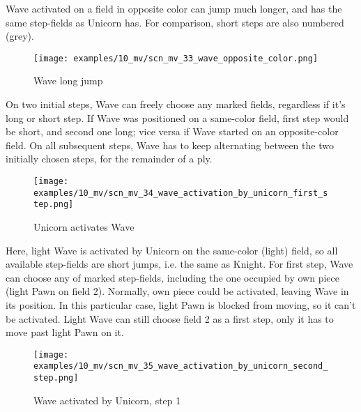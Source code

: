 Wave activated on a field in opposite color can jump much longer, and has the same step-fields
as Unicorn has. For comparison, short steps are also numbered (grey).

\vspace*{0.7\baselineskip}
\noindent
\begin{wrapfigure}[18]{l}{0.7\textwidth}
\centering
\texttt{[image: examples/10\_mv/scn\_mv\_33\_wave\_opposite\_color.png]}
\vspace*{-0.3\baselineskip}
\caption{Wave long jump}
\label{fig:scn_mv_33_wave_opposite_color}
\end{wrapfigure}
On two initial steps, Wave can freely choose any marked fields, regardless if it's long or short step.
If Wave was positioned on a same-color field, first step would be short, and second one long; vice versa
if Wave started on an opposite-color field. On all subsequent steps, Wave has to keep alternating between
the two initially chosen steps, for the remainder of a ply.

\clearpage %

\vspace*{-2.1\baselineskip}
\noindent
\begin{figure}[!h]
\texttt{[image: examples/10\_mv/scn\_mv\_34\_wave\_activation\_by\_unicorn\_first\_step.png]}
\vspace*{-1.3\baselineskip}
\caption{Unicorn activates Wave}
\label{fig:scn_mv_34_wave_activation_by_unicorn_first_step}
\end{figure}

\vspace*{-0.3\baselineskip}
Here, light Wave is activated by Unicorn on the same-color (light) field, so all available
step-fields are short jumps, i.e. the same as Knight. For first step, Wave can choose any of
marked step-fields, including the one occupied by own piece (light Pawn on field 2). Normally,
own piece could be activated, leaving Wave in its position. In this particular case, light Pawn
is blocked from moving, so it can't be activated. Light Wave can still choose field 2 as a first
step, only it has to move past light Pawn on it.

\clearpage %

\vspace*{-2.1\baselineskip}
\noindent
\begin{figure}[!h]
\texttt{[image: examples/10\_mv/scn\_mv\_35\_wave\_activation\_by\_unicorn\_second\_step.png]}
\caption{Wave activated by Unicorn, step 1}
\label{fig:scn_mv_35_wave_activation_by_unicorn_second_step}
\end{figure}

